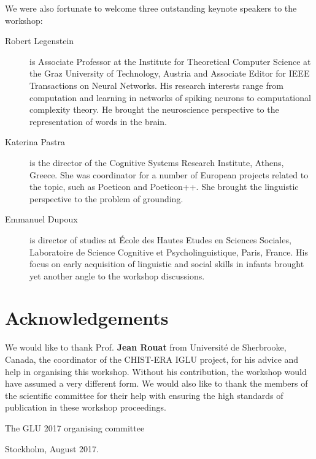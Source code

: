 \documentclass{confproc}
\begin{document}
We were also fortunate to welcome three outstanding keynote speakers to the workshop:
\begin{description}
\item[Robert Legenstein] is Associate Professor at the Institute for Theoretical Computer Science at the Graz University of Technology, Austria and Associate Editor for IEEE Transactions on Neural Networks. His research interests range from computation and learning in networks of spiking neurons to computational complexity theory. He brought the neuroscience perspective to the representation of words in the brain.
\item[Katerina Pastra] is the director of the Cognitive Systems Research Institute, Athens, Greece. She was coordinator for a number of European projects related to the topic, such as Poeticon and Poeticon++. She brought the linguistic perspective to the problem of grounding.
\item[Emmanuel Dupoux] is director of studies at École des Hautes Etudes en Sciences Sociales, Laboratoire de Science Cognitive et Psycholinguistique, Paris, France. His focus on early acquisition of linguistic and social skills in infants brought yet another angle to the workshop discussions.
\end{description}
\section*{Acknowledgements}
We would like to thank Prof. \textbf{Jean Rouat} from Université de Sherbrooke, Canada, the coordinator of the CHIST-ERA IGLU project, for his advice and help in organising this workshop. Without his contribution, the workshop would have assumed a very different form. We would also like to thank the members of the scientific committee for their help with ensuring the high standards of publication in these workshop proceedings.

\vspace{5mm}
\noindent The GLU 2017 organising committee

\noindent Stockholm, August 2017.

\newpage
\end{document}
